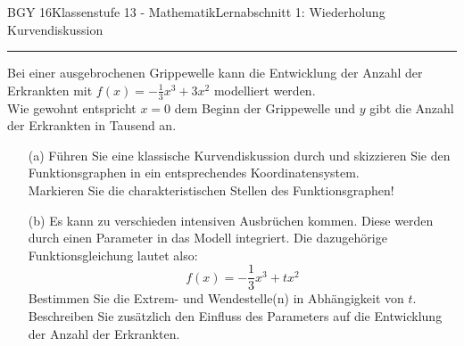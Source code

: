 \documentclass[oneside,openany,headings=optiontotoc,11pt,numbers=noenddot]{scrreprt}
\begin{document}
\begin{worksheet}{BGY 16}{Klassenstufe 13 - Mathematik}{Lernabschnitt 1: Wiederholung Kurvendiskussion}
\begin{center}
		\end{center}
		\hrule
		\par\bigskip\noindent
		\begin{framed}
			\noindent
			Bei einer ausgebrochenen Grippewelle kann die Entwicklung der Anzahl der Erkrankten mit \(f(x) = -\frac{1}{3}x^3 + 3x^2\) modelliert werden.\\
			Wie gewohnt entspricht \(x = 0\) dem Beginn der Grippewelle und \(y\) gibt die Anzahl der Erkrankten in Tausend an.
		\end{framed}
		\begin{itemize}
			\item[(a)] Führen Sie eine klassische Kurvendiskussion durch und skizzieren Sie den Funktionsgraphen in ein entsprechendes Koordinatensystem.\\
			Markieren Sie die charakteristischen Stellen des Funktionsgraphen!
			\item[(b)] Es kann zu verschieden intensiven Ausbrüchen kommen. Diese werden durch einen Parameter in das Modell integriert. Die dazugehörige Funktionsgleichung lautet also:
			\[f(x) = -\frac{1}{3}x^3 +tx^2\]
			Bestimmen Sie die Extrem- und Wendestelle(n) in Abhängigkeit von \(t\).\\
			Beschreiben Sie zusätzlich den Einfluss des Parameters auf die Entwicklung der Anzahl der Erkrankten.
		\end{itemize}
	\end{worksheet}
\end{document}
